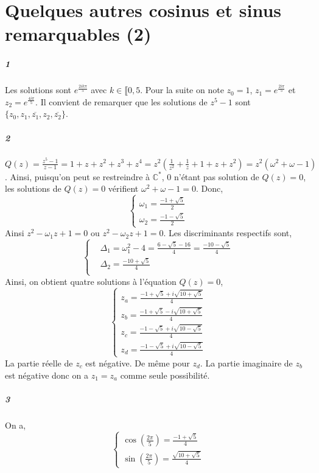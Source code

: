 \documentclass[10pt,a4paper]{article}
\begin{document}
\section{Quelques autres cosinus et sinus remarquables (2)}
\subparagraph{1}Les solutions sont $ e^{\frac{2ik\pi}{5}}$ avec $k \in \llbracket 0,5$. Pour la suite on note $z_0 = 1$, $z_1 = e^{\frac{2i\pi}{5}}$ et $z_2 = e^{\frac{4i \pi}{5}}$. Il convient de remarquer que les solutions de $z^5-1$ sont $\lbrace z_0,z_1, \overline{z_1}, z_2, \overline{z_2} \rbrace$.
\subparagraph{2}$Q(z) = \frac{z^5-1}{z-1} = 1 + z + z^2 + z^3 + z^4 = z^2(\frac{1}{z^2} + \frac{1}{z} + 1 + z + z^2) = z^2(\omega^2 + \omega -1)$. Ainsi, puisqu'on peut se restreindre à $\mathbb{C}^*$, $0$ n'étant pas solution de $Q(z)=0$, les solutions de $Q(z)=0$ vérifient $\omega^2 + \omega - 1 =0$. Donc, \begin{equation}
\left\lbrace
\begin{aligned}
\omega_1 = \frac{-1 + \sqrt{5}}{2} \\
\omega_2 = \frac{-1 - \sqrt{5}}{2}
\end{aligned}
\right.
\end{equation}
Ainsi $z^2 - \omega_1z +1 = 0$ ou  $z^2 - \omega_2z +1 = 0$. Les discriminants respectifs sont,
\begin{equation}
\left\lbrace
\begin{aligned}
&\Delta_1 = \omega_1^2 -4 = \frac{6-\sqrt{5}-16}{4} = \frac{-10 - \sqrt{5}}{4} \\
&\Delta_2 = \frac{-10 + \sqrt{5}}{4} \\
\end{aligned}
\right.
\end{equation}
Ainsi, on obtient quatre solutions à l'équation $Q(z) = 0$,
\begin{equation}
\left\lbrace
\begin{aligned}
z_a =\frac{-1+ \sqrt{5} + i \sqrt{10 +\sqrt{5}}}{4} \\
z_b =\frac{-1+ \sqrt{5} - i \sqrt{10 +\sqrt{5}}}{4} \\
z_c =\frac{-1- \sqrt{5} + i \sqrt{10 -\sqrt{5}}}{4} \\
z_d =\frac{-1- \sqrt{5} + i \sqrt{10 -\sqrt{5}}}{4}
\end{aligned}
\right.
\end{equation}
La partie réelle de $z_c$ est négative. De même pour $z_d$. La partie imaginaire de $z_b$ est négative donc on a $z_1 = z_a$ comme seule possibilité.
\subparagraph{3}On a,
\begin{equation}
\left\lbrace
\begin{aligned}
\cos \left( \frac{2\pi}{5} \right) = \frac{-1 + \sqrt{5}}{4} \\
\sin \left( \frac{2 \pi}{5} \right) = \frac{\sqrt{10 + \sqrt{5}}}{4}
\end{aligned}
\right.
\end{equation}
\end{document}
